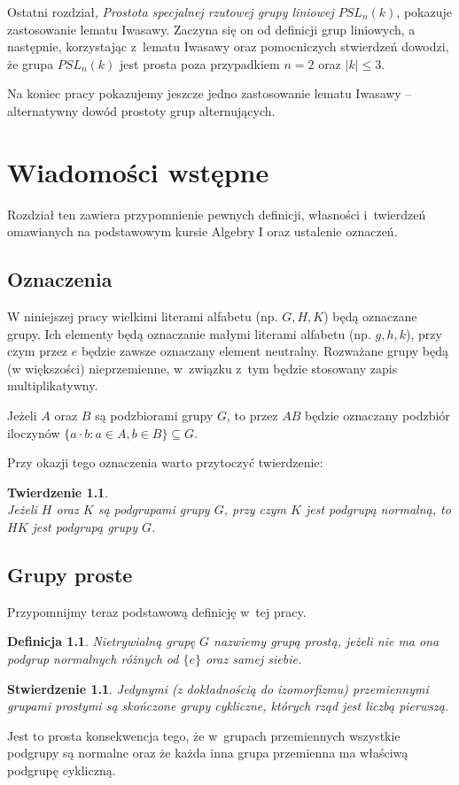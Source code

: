 \documentclass[licencjacka]{pracamgr}
\newtheorem{deff}{Definicja}[section]
\newtheorem{thh}{Twierdzenie}[section]
\newtheorem{fact}{Stwierdzenie}[section]
\begin{document}
Ostatni rozdział, \emph{Prostota specjalnej rzutowej grupy liniowej $PSL_n(k)$},
pokazuje zastosowanie lematu Iwasawy.
Zaczyna się on od definicji grup liniowych, a następnie, korzystając z~lematu Iwasawy 
oraz pomocniczych stwierdzeń dowodzi, że grupa $PSL_n(k)$ jest prosta poza przypadkiem $n = 2$ oraz $|k| \le 3$.

Na koniec pracy pokazujemy jeszcze jedno zastosowanie lematu Iwasawy -- alternatywny dowód 
prostoty grup alternujących.



\chapter{Wiadomości wstępne}

Rozdział ten zawiera przypomnienie pewnych definicji, własności
i~twierdzeń omawianych na podstawowym kursie
Algebry I oraz ustalenie oznaczeń.

\section{Oznaczenia}

W niniejszej pracy wielkimi literami alfabetu (np.
$G, H, K$) będą oznaczane grupy. Ich elementy będą oznaczanie małymi
literami alfabetu (np. $g, h, k$), przy czym przez $e$ będzie zawsze
oznaczany element neutralny. Rozważane grupy będą (w większości)
nieprzemienne, w~związku z~tym będzie stosowany zapis
multiplikatywny.

Jeżeli $A$ oraz $B$ są podzbiorami grupy $G$, to przez $AB$
będzie oznaczany podzbiór iloczynów $\{ a\cdot b \colon a \in A, b \in B\}\subseteq G$.

Przy okazji tego oznaczenia warto przytoczyć twierdzenie:

\begin{thh} \label{mult_groups} $ $ \\
    Jeżeli $H$ oraz $K$ są podgrupami grupy $G$, przy czym $K$ jest podgrupą normalną,
    to $HK$ jest podgrupą grupy $G$.
\end{thh}


\section{Grupy proste}

Przypomnijmy teraz podstawową definicję w~tej pracy.
\begin{deff}
    Nietrywialną grupę $G$ nazwiemy \emph{grupą prostą}, jeżeli nie ma ona podgrup normalnych różnych od $\{e\}$ oraz samej siebie.
\end{deff}
\begin{fact}
    Jedynymi (z dokładnością do izomorfizmu) przemiennymi grupami prostymi są skończone grupy cykliczne,
    których rząd jest liczbą pierwszą.
\end{fact}
Jest to prosta konsekwencja tego, że w~grupach przemiennych
wszystkie podgrupy są normalne oraz że każda inna grupa przemienna ma właściwą podgrupę cykliczną.
\end{document}
